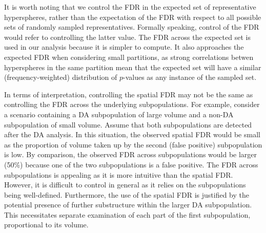 \documentclass{article}
\begin{document}
It is worth noting that we control the FDR in the expected set of representative hyperspheres, rather than the expectation of the FDR with respect to all possible sets of randomly sampled representatives.
Formally speaking, control of the FDR would refer to controlling the latter value.
The FDR across the expected set is used in our analysis because it is simpler to compute.
It also approaches the expected FDR when considering small partitions, as strong correlations betwen hyperspheres in the same partition mean that the expected set will have a similar (frequency-weighted) distribution of $p$-values as any instance of the sampled set.

In terms of interpretation, controlling the spatial FDR may not be the same as controlling the FDR across the underlying subpopulations.
For example, consider a scenario containing a DA subpopulation of large volume and a non-DA subpopulation of small volume.
Assume that both subpopulations are detected after the DA analysis.
In this situation, the observed spatial FDR would be small as the proportion of volume taken up by the second (false positive) subpopulation is low.
By comparison, the observed FDR across subpopulations would be larger (50\%) because one of the two subpopulations is a false positive.
The FDR across subpopulations is appealing as it is more intuitive than the spatial FDR.
However, it is difficult to control in general as it relies on the subpopulations being well-defined.
Furthermore, the use of the spatial FDR is justified by the potential presence of further substructure within the larger DA subpopulation.
This necessitates separate examination of each part of the first subpopulation, proportional to its volume.

\end{document}

